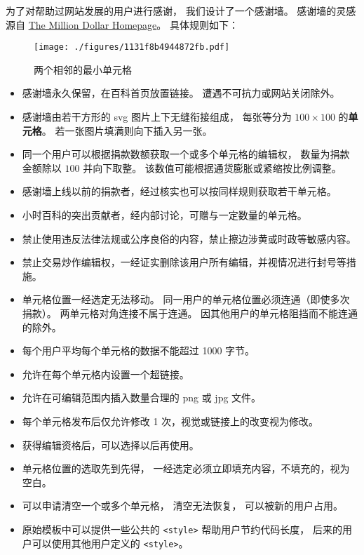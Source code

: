 
\begin{issues}
\issueDraft
{}
\end{issues}

为了对帮助过网站发展的用户进行感谢， 我们设计了一个感谢墙。 感谢墙的灵感源自 \href{https://en.wikipedia.org/wiki/The_Million_Dollar_Homepage}{The Million Dollar Homepage}。 具体规则如下：

\begin{figure}[ht]
\centering
\texttt{[image: ./figures/1131f8b4944872fb.pdf]}
\caption{两个相邻的最小单元格} \label{fig_thanks_1}
\end{figure}

\begin{itemize}
\item 感谢墙永久保留，在百科首页放置链接。 遭遇不可抗力或网站关闭除外。
\item 感谢墙由若干方形的 svg 图片上下无缝衔接组成， 每张等分为 $100\times 100$ 的\textbf{单元格}。 若一张图片填满则向下插入另一张。
\item 同一个用户可以根据捐款数额获取一个或多个单元格的编辑权， 数量为捐款金额除以 $100$ 并向下取整。 该数值可能根据通货膨胀或紧缩按比例调整。
\item 感谢墙上线以前的捐款者，经过核实也可以按同样规则获取若干单元格。
\item 小时百科的突出贡献者，经内部讨论，可赠与一定数量的单元格。
\item 禁止使用违反法律法规或公序良俗的内容，禁止擦边涉黄或时政等敏感内容。
\item 禁止交易炒作编辑权，一经证实删除该用户所有编辑，并视情况进行封号等措施。
\item 单元格位置一经选定无法移动。 同一用户的单元格位置必须连通（即使多次捐款）。 两单元格对角连接不属于连通。 因其他用户的单元格阻挡而不能连通的除外。
\item 每个用户平均每个单元格的数据不能超过 1000 字节。
\item 允许在每个单元格内设置一个超链接。
\item 允许在可编辑范围内插入数量合理的 png 或 jpg 文件。
\item 每个单元格发布后仅允许修改 1 次，视觉或链接上的改变视为修改。
\item 获得编辑资格后，可以选择以后再使用。
\item 单元格位置的选取先到先得， 一经选定必须立即填充内容，不填充的，视为空白。
\item 可以申请清空一个或多个单元格， 清空无法恢复， 可以被新的用户占用。
\item 原始模板中可以提供一些公共的 \verb`<style>` 帮助用户节约代码长度， 后来的用户可以使用其他用户定义的 \verb`<style>`。
\end{itemize}
